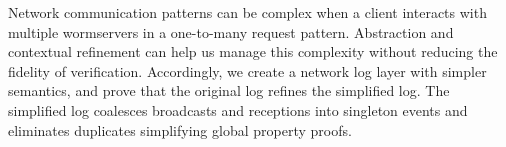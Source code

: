 




Network communication patterns can be complex when a client interacts with multiple wormservers in a one-to-many request pattern.
Abstraction and contextual refinement can help us manage this complexity without reducing the fidelity of verification.
Accordingly, we create a network log layer with simpler semantics, and prove that the original log refines the simplified log.
The simplified log coalesces broadcasts and receptions into singleton events and eliminates duplicates simplifying global property proofs.








